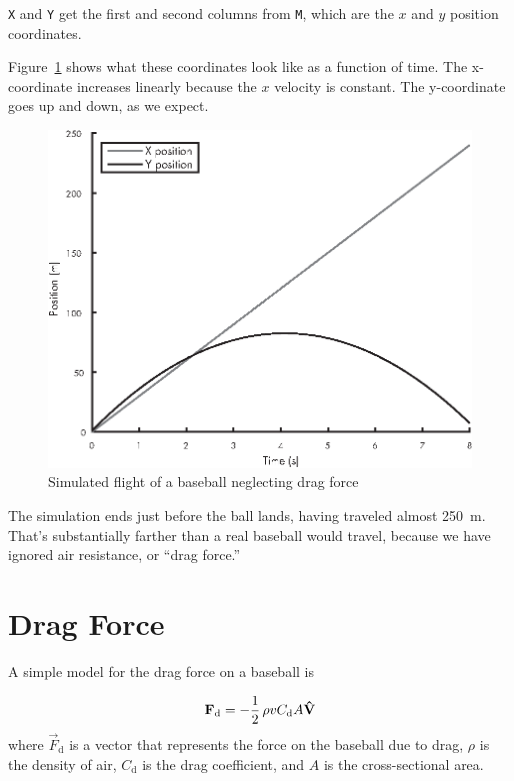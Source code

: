 \lstinline{X} and \lstinline{Y} get the first and second columns from \lstinline{M}, which are the $x$ and $y$ position coordinates.


Figure~\ref{fig:baseball1} shows what these coordinates look like as a function of time.  The x-coordinate increases linearly because the $x$ velocity is constant.  The y-coordinate goes up and down, as we expect.

\begin{figure}[h]
\centerline{\includegraphics[scale=0.8]{images/figure12_02_new.eps}}
\caption{Simulated flight of a baseball neglecting drag force}
\label{fig:baseball1}
\end{figure}

The simulation ends just before the ball lands, having traveled almost \SI{250}{\meter}.  That's substantially farther than a real baseball would travel, because we have ignored air resistance, or ``drag force.''


\section{Drag Force}
\label{drag}


A simple model for the drag force on a baseball is

\begin{equation*}
    \vec{F}_\mathrm{d} = - \frac{1}{2} \, \rho v C_\mathrm{d} A \uvec{V}
\end{equation*}
where $\vec{F}_\mathrm{d}$ is a vector that represents the force on the baseball
due to drag, 
$\rho$ is the density of air, 
$C_\mathrm{d}$ is the drag coefficient, and
$A$ is the cross-sectional area.

